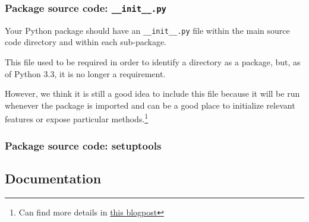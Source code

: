 \documentclass[10pt]{beamer}
\begin{document}
  \begin{frame} \frametitle{Package source code: \texttt{\_\_init\_\_.py}}

    Your Python package should have an \texttt{\_\_init\_\_.py} file within the main
    source code directory and within each sub-package.

    \vspace{0.25cm}

    This file used to be required in order to identify a directory as a package, but, as
    of Python 3.3, it is no longer a requirement.

    \vspace{0.25cm}

    However, we think it is still a good idea to include this file because it will be run
    whenever the package is imported and can be a good place to initialize relevant
    features or expose particular methods.\footnote{Can find more details in
    \href{http://python-notes.curiousefficiency.org/en/latest/python_concepts/import_traps.html}{this blogpost}
    }

  \end{frame}

  \begin{frame} \frametitle{Package source code: setuptools}


    \vspace{0.25cm}


    \vspace{0.25cm}


  \end{frame}

  \subsection{Documentation}
\end{document}

